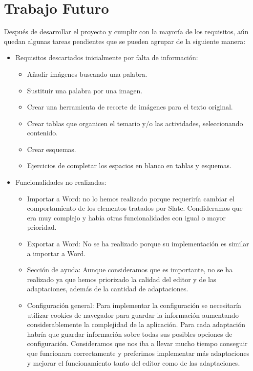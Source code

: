 \section{Trabajo Futuro}
\label{sec:TrabajoFuturo}
Después de desarrollar el proyecto y cumplir con la mayoría de los requisitos, aún quedan algunas tareas pendientes que se pueden agrupar de la siguiente manera:

\begin{itemize}
    \item Requisitos descartados inicialmente por falta de información:
    \begin{itemize}
        \item Añadir imágenes buscando una palabra.
        \item Sustituir una palabra por una imagen.
        \item Crear una herramienta de recorte de imágenes para el texto original.
        \item Crear tablas que organicen el temario y/o las actividades, seleccionando contenido.
        \item Crear esquemas.
        \item Ejercicios de completar los espacios en blanco en tablas y esquemas.        
    \end{itemize}
    \item Funcionalidades no realizadas:
    \begin{itemize}
        \item Importar a Word: no lo hemos realizado porque requeriría cambiar el comportamiento de los elementos tratados por Slate. Condideramos que era muy complejo y había otras funcionalidades con igual o mayor prioridad.
        \item Exportar a Word: No se ha realizado porque su implementación es similar a importar a Word.      
        \item Sección de ayuda: Aunque consideramos que es importante, no se ha realizado ya que hemos priorizado la calidad del editor y de las adaptaciones, además de la cantidad de adaptaciones.
        \item Configuración general: Para implementar la configuración se necesitaría utilizar cookies de navegador para guardar la información aumentando considerablemente la complejidad de la aplicación. Para cada adaptación habría que guardar información sobre todas sus posibles opciones de configuración. Consideramos que nos iba a llevar mucho tiempo conseguir que funcionara correctamente y preferimos implementar más adaptaciones y mejorar el funcionamiento tanto del editor como de las adaptaciones.
    \end{itemize}
\end{itemize}


